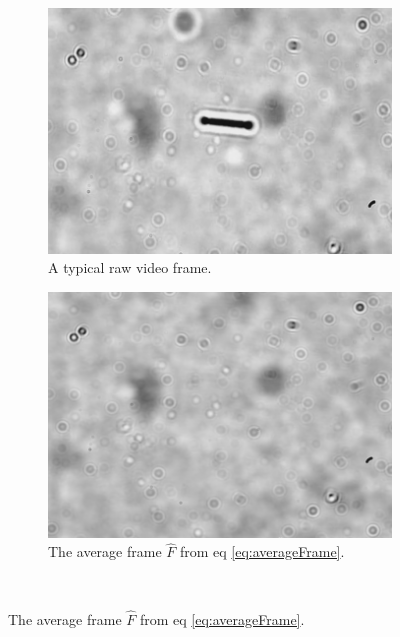 \begin{figure}[H]
\centering
\begin{subfigure}[3a]{0.40\textwidth}
\includegraphics[width=\textwidth]{figures/method/static1.png}
\caption{A typical raw video frame.}\label{fig:origFrame}
\end{subfigure}\hspace{1em}%
\begin{subfigure}[3b]{0.40\textwidth}
\includegraphics[width=\textwidth]{figures/method/static3.png}
\caption{The average frame $\hat{F}$ from eq \ref{eq:averageFrame}.}\label{fig:averageFrame}
\end{subfigure} \\


\end{figure}
